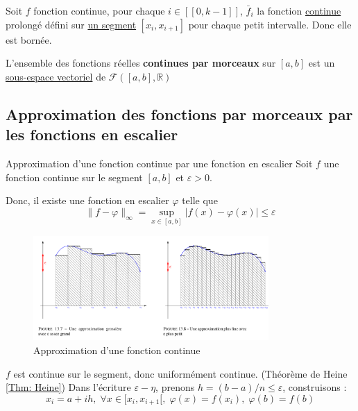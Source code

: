 \begin{myproof}{}{}
  Soit $f$ fonction continue, pour chaque $i \in [\![0, k-1]\!]$, $\bar{f}_i$ la fonction \underline{continue} prolongé défini sur \underline{un segment} $[x_i, x _{i+1}]$ pour chaque petit intervalle. Donc elle est bornée.
\end{myproof}

\begin{Prop}{}{}
  L'ensemble des fonctions réelles \textbf{continues par morceaux} sur $[a,b]$ est un \underline{sous-espace vectoriel} de $\mathcal{F}([a,b], \mathbb{R})$
\end{Prop}

\subsection{Approximation des fonctions par morceaux par les fonctions en escalier} %
\label{sub:Approximation des fonctions par morceaux par les fonctions en escalier}

\begin{Theorem}{Approximation d'une fonction continue par une fonction en escalier}{}
  Soit $f$ une fonction continue sur le segment $[a,b]$ et $\varepsilon>0$. 

  Donc, il existe une fonction en escalier $\varphi$ telle que 
  \[
    \| f- \varphi \| _{\infty}  = \sup _{x \in [a,b]} |f(x) - \varphi(x)|\le \varepsilon
  \]

  \begin{figure}[H] %
    \centering
    \includegraphics[width=0.8\textwidth]{./assets/Approximation d'une fonction 1.png}
    \caption{Approximation d'une fonction continue}
  \end{figure}

  
\end{Theorem}

\begin{myproof}{}{}
  $f$ est continue sur le segment, donc uniformément continue. (Théorème de Heine \ref{Thm: Heine}) Dans l'écriture $\varepsilon - \eta$, prenons $h = (b-a)/n \le \varepsilon$, construisons :
  \begin{equation}
    x_i = a + ih,\; \forall x \in [x_i,x _{i+1}[ , \; \varphi(x) = f(x_i),\; \varphi(b) = f(b)
  \end{equation}
\end{myproof}


